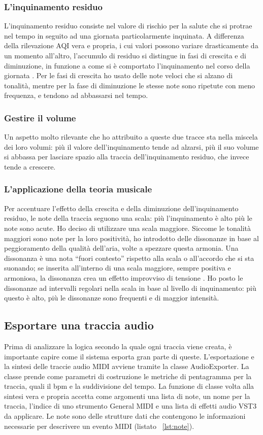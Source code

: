 \subsubsection{L'inquinamento residuo}
L'inquinamento residuo consiste nel valore di rischio per la salute che si protrae nel tempo in seguito ad una giornata particolarmente inquinata.
A differenza della rilevazione AQI vera e propria, i cui valori possono variare drasticamente da un momento all'altro, l'accumulo di residuo si distingue in fasi di crescita e di diminuzione, in funzione a come si è comportato l'inquinamento nel corso della giornata \cite{residue}.
Per le fasi di crescita ho usato delle note veloci che si alzano di tonalità, mentre per la fase di diminuzione le stesse note sono ripetute con meno frequenza, e tendono ad abbassarsi nel tempo.
\subsubsection{Gestire il volume}
Un aspetto molto rilevante che ho attribuito a queste due tracce sta nella miscela dei loro volumi: più il valore dell'inquinamento tende ad alzarsi, più il suo volume si abbassa per lasciare spazio alla traccia dell'inquinamento residuo, che invece tende a crescere.
\subsubsection{L'applicazione della teoria musicale}
Per accentuare l'effetto della crescita e della diminuzione dell'inquinamento residuo, le note della traccia seguono una scala: più l'inquinamento è alto più le note sono acute.
Ho deciso di utilizzare una scala maggiore. Siccome le tonalità maggiori sono note per la loro positività, ho introdotto delle dissonanze in base al peggioramento della qualità dell'aria, volte a spezzare questa armonia.
Una dissonanza è una nota “fuori contesto” rispetto alla scala o all'accordo che si sta suonando; se inserita all'interno di una scala maggiore, sempre positiva e armoniosa, la dissonanza crea un effetto improvviso di tensione \cite{dissonance}.
Ho posto le dissonanze ad intervalli regolari nella scala in base al livello di inquinamento: più questo è alto, più le dissonanze sono frequenti e di maggior intensità.




\subsection{Esportare una traccia audio}
Prima di analizzare la logica secondo la quale ogni traccia viene creata, è importante capire come il sistema esporta gran parte di queste.
L'esportazione e la sintesi delle traccie audio MIDI avviene tramite la classe AudioExporter.
La classe prende come parametri di costruzione le metriche di pentagramma per la traccia, quali il bpm e la suddivisione del tempo.
La funzione di classe volta alla sintesi vera e propria accetta come argomenti una lista di note, un nome per la traccia, l'indice di uno strumento General MIDI e una lista di effetti audio VST3 da applicare.
Le note sono delle strutture dati che contengono le informazioni necessarie per descrivere un evento MIDI (listato ~\ref{lst:note}).

